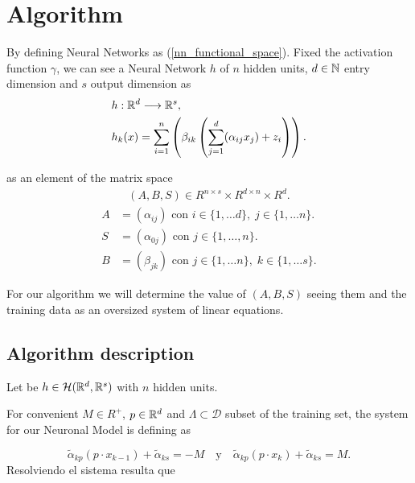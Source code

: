 \section*{Algorithm} 

By defining Neural Networks as (\ref{nn_functional_space}).  Fixed the activation function 
$\gamma$, we can see a Neural Network $h$ of $n$ hidden 
units, $d \in \mathbb{N}$ entry dimension and $s$ output
dimension as 
\begin{align}
    &h: \mathbb{R}^d \longrightarrow \mathbb{R}^s,\\
    &h_k(x) = \sum_{i= 1}^n 
        \left(
            \beta_{i k} 
            \left( 
                \sum_{j = 1}^d
                (
                    \alpha_{i j} x_j
                ) + z_i
            \right)
        \right).
\end{align}

as an element of the matrix space 
\begin{align}
    (A,B,S) \in R^{n \times s} \times R^{d \times n} \times R^{d}.
\end{align} 
\begin{align*}\label{eq:representation red neuronal}
    A &= (\alpha_{i j}) \text{ con }  i \in \{1, \ldots d\}, \; j \in \{1, \ldots n\}. \\
    S &= (\alpha_{0 j}) \text{ con }  j \in \{1, \ldots, n\}. \\
    B &= (\beta_{j k}) \text{ con }  j \in \{1, \ldots n\}, \; k \in \{1, \ldots s\}.
\end{align*}

For our algorithm we will determine the value of 
$(A,B,S)$ seeing them and the training data as an oversized system of linear equations. 

\subsection*{Algorithm description}  

Let be $h \in  \mathcal{H}(\mathbb{R}^d, \mathbb{R}^s)$
 with $n$ hidden units. 

For convenient $M \in R^+$,  $p \in \mathbb{R}^d$ and $\Lambda \subset \mathcal{D}$ subset of the training set, the system for our Neuronal Model is defining as 

\begin{equation}
    \tilde{\alpha}_{k p} (p \cdot x_{k-1}) + \tilde{\alpha}_{k s} = -M 
    \quad \text{y} \quad 
    \tilde{\alpha}_{k p}(p \cdot x_k) + \tilde{\alpha}_{k s}= M.
\end{equation} 
Resolviendo el sistema resulta que 


